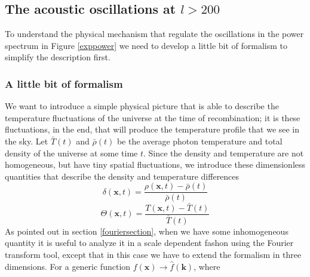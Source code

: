 \subsection{The acoustic oscillations at $l>200$}
To understand the physical mechanism that regulate the oscillations in the power spectrum in Figure \ref{exppower} we need to develop a little bit of formalism to simplify the description first.
\subsubsection{A little bit of formalism}
We want to introduce a simple physical picture that is able to describe the temperature fluctuations of the universe at the time of recombination; it is these fluctuations, in the end, that will produce the temperature profile that we see in the sky. Let $\bar{T}(t)$ and $\bar{\rho}(t)$ be the average photon temperature and total density of the universe at some time $t$. Since the density and temperature are not homogeneous, but have tiny spatial fluctuations, we introduce these dimensionless quantities that describe the density and temperature differences
\begin{equation}
\delta(\mathbf{x},t)=\frac{\rho(\mathbf{x},t)-\bar{\rho}(t)}{\bar{\rho}(t)}
\end{equation}
\begin{equation}
\Theta(\mathbf{x},t)=\frac{T(\mathbf{x},t)-\bar{T}(t)}{\bar{T}(t)}
\end{equation}
As pointed out in section \ref{fouriersection}, when we have some inhomogeneous quantity it is useful to analyze it in a scale dependent fashon using the Fourier transform tool, except that in this case we have to extend the formalism in three dimensions. For a generic function $f(\mathbf{x})\rightarrow \hat{f}(\mathbf{k})$, where 
